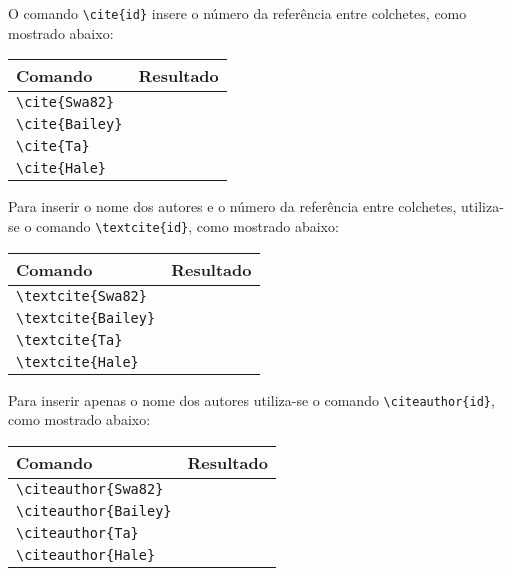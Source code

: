 O comando \lstinline+\cite{id}+ insere o número da referência entre colchetes,
como mostrado abaixo:
\begin{center}
  \centering
  \begin{tabular}{|l|c|}
    \hline
    Comando & Resultado \\ \hline
    \lstinline+\cite{Swa82}+ & \cite{Swa82} \\ \hline
    \lstinline+\cite{Bailey}+ & \cite{Bailey} \\ \hline
    \lstinline+\cite{Ta}+ & \cite{Ta} \\ \hline
    \lstinline+\cite{Hale}+ & \cite{Hale} \\ \hline
  \end{tabular}
\end{center}

Para inserir o nome dos autores e o número da referência entre colchetes,
utiliza-se o comando \lstinline+\textcite{id}+, como mostrado abaixo:
\begin{center}
  \centering
  \begin{tabular}{|l|c|}
    \hline
    Comando & Resultado \\ \hline
    \lstinline+\textcite{Swa82}+ & \textcite{Swa82} \\ \hline
    \lstinline+\textcite{Bailey}+ & \textcite{Bailey} \\ \hline
    \lstinline+\textcite{Ta}+ & \textcite{Ta} \\ \hline
    \lstinline+\textcite{Hale}+ & \textcite{Hale} \\ \hline
  \end{tabular}
\end{center}

Para inserir apenas o nome dos autores utiliza-se o comando
\lstinline+\citeauthor{id}+, como mostrado abaixo:
\begin{center}
  \centering
  \begin{tabular}{|l|c|}
    \hline
    Comando & Resultado \\ \hline
    \lstinline+\citeauthor{Swa82}+ & \citeauthor{Swa82} \\ \hline
    \lstinline+\citeauthor{Bailey}+ & \citeauthor{Bailey} \\ \hline
    \lstinline+\citeauthor{Ta}+ & \citeauthor{Ta} \\ \hline
    \lstinline+\citeauthor{Hale}+ & \citeauthor{Hale} \\ \hline
  \end{tabular}
\end{center}

